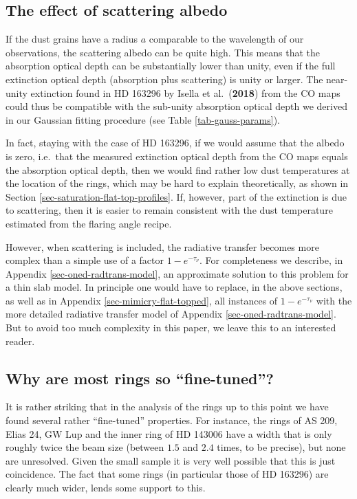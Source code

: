 \documentclass{aa}
\def\paperdsharpisella{Isella et al.\ ({\bf 2018})}
\begin{document}
\subsection{The effect of scattering albedo}
If the dust grains have a radius $a$ comparable to the wavelength of our
observations, the scattering albedo can be quite high. This means that the
absorption optical depth can be substantially lower than unity, even if the full
extinction optical depth (absorption plus scattering) is unity or larger.  The
near-unity extinction found in HD 163296 by \paperdsharpisella{} from the CO
maps could thus be compatible with the sub-unity absorption optical depth we
derived in our Gaussian fitting procedure (see Table \ref{tab-gauss-params}).

In fact, staying with the case of HD 163296, if we would assume that the albedo
is zero, i.e.\ that the measured extinction optical depth from the CO maps
equals the absorption optical depth, then we would find rather low dust
temperatures at the location of the rings, which may be hard to explain
theoretically, as shown in Section \ref{sec-saturation-flat-top-profiles}.
If, however, part of the extinction is due to scattering, then it is easier
to remain consistent with the dust temperature estimated from the flaring
angle recipe.

However, when scattering is included, the radiative transfer becomes more
complex than a simple use of a factor $1-e^{-\tau_\nu}$. For completeness we
describe, in Appendix \ref{sec-oned-radtrans-model}, an approximate solution to
this problem for a thin slab model.  In principle one would have to replace, in
the above sections, as well as in Appendix \ref{sec-mimicry-flat-topped}, all
instances of $1-e^{-\tau_\nu}$ with the more detailed radiative transfer model
of Appendix \ref{sec-oned-radtrans-model}. But to avoid too much complexity in
this paper, we leave this to an interested reader.

\subsection{Why are most rings so ``fine-tuned''?}
It is rather striking that in the analysis of the rings up to this point we have
found several rather ``fine-tuned'' properties. For instance, the rings of AS
209, Elias 24, GW Lup and the inner ring of HD 143006 have a width that is only
roughly twice the beam size (between $1.5$ and $2.4$ times, to be precise), but
none are unresolved. Given the small sample it is very well possible that this
is just coincidence. The fact that some rings (in particular those of HD 163296)
are clearly much wider, lends some support to this.
\end{document}
